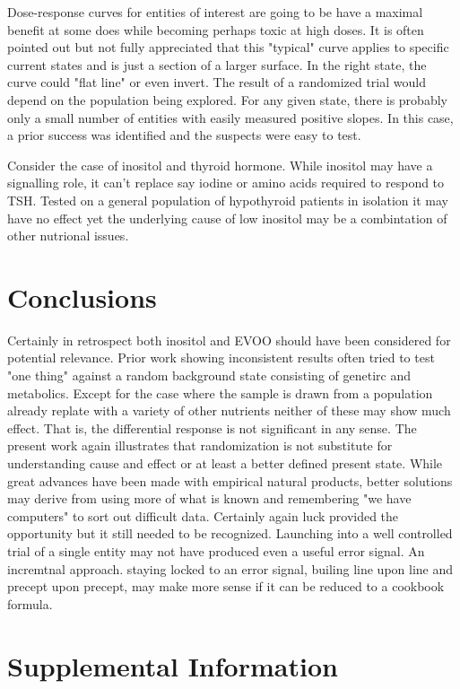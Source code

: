 Dose-response curves for entities of interest are going to 
be have a maximal benefit at some does while becoming perhaps
toxic at high doses. It is often pointed out but not fully 
appreciated that this "typical" curve applies to specific
current states and is just a section of a larger surface.
In the right state, the curve could "flat line" or even invert.
The result of a randomized trial would depend on the population
being explored.  For any given state, there is probably only
a small number of entities with easily measured positive slopes.
In this case, a prior success was identified and the suspects
were easy to test. 

Consider the case of inositol and thyroid hormone. While inositol
may have a signalling role, it can't replace say iodine or amino
acids required to respond to TSH.  Tested on a general population
of hypothyroid patients in isolation it may have no effect yet
the underlying cause of low inositol may be a combintation
of other nutrional issues.  






\section{Conclusions}
Certainly in retrospect both inositol and EVOO should have been 
considered for potential relevance. Prior work showing inconsistent
results often tried to test "one thing" against a random background
state consisting of genetirc and metabolics. Except for the case where
the sample is drawn from a population already replate with a variety
of other nutrients neither of these may show much effect. That is, the
differential response is not significant in any sense. The present work
again illustrates that randomization is not substitute for understanding
cause and effect or at least a better defined present state. While great 
advances have been made with empirical natural products, better solutions
may derive from using more of what is known and remembering "we have 
computers" to sort out difficult data. 
Certainly again luck provided the opportunity but it still needed
to be recognized.  Launching into a well controlled trial of a single
entity may not have produced even a useful error signal.
An incremtnal approach. staying locked to an error signal, builing
line upon line and precept upon precept, may make more sense
if it can be reduced to a cookbook formula.
 


\section{Supplemental Information}

